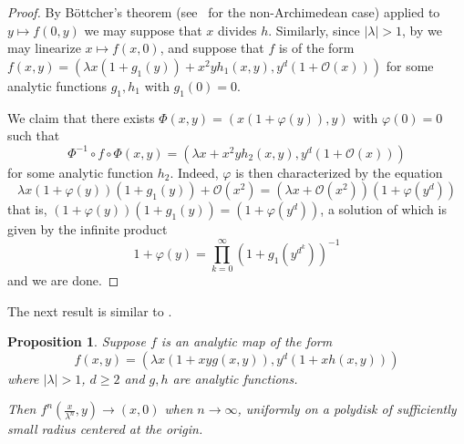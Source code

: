 \documentclass[11 pt, oneside, a4paper]{amsart}
\newcommand{\inv}{^{-1}}
\newtheorem{prop}[thm]{Proposition}
\theoremstyle{definition}
\theoremstyle{definition}
\begin{document}
\begin{proof}
By B\"ottcher's theorem (see~\cite[Chapter 4]{benedetto:dyn1NA} for the non-Archimedean case)
applied to $y \mapsto f(0,y)$ we may suppose that $x$ divides $h$.
Similarly, since $|\lambda|>1$, by  
we may linearize $x \mapsto f(x,0)$, and suppose that $f$ is of the form
$f(x,y) =  (\lambda x (1+ g_1(y))+ x^2y h_1(x,y) , y^d (1+\mathcal{O}(x)))$ for some analytic functions $g_1,h_1$ with $g_1(0)=0$. 
 
We claim that there exists $\Phi(x,y) = (x(1+ \varphi(y)), y)$
with $\varphi(0)=0$ such that 
$$\Phi\inv \circ f\circ \Phi(x,y) =  (\lambda x + x^2y h_2(x,y) , y^d(1+\mathcal{O}(x)))$$ 
for some analytic function $h_2$.
Indeed, $\varphi$ is then characterized by the equation 
\[ \lambda x(1+ \varphi(y))(1+g_1(y)) + \mathcal{O}(x^2)
=
(\lambda x + \mathcal{O}(x^2)) (1+ \varphi(y^d))
\]
that is, $(1+ \varphi(y))(1+g_1(y))= (1+ \varphi(y^d))$, a solution of which is given by the infinite product
\[
1+ \varphi(y) = \prod_{k=0}^\infty \left(1+g_1\left(y^{d^k}\right)\right)^{-1}
\] and we are done.
\end{proof}


The next result is similar to \cite[Lemma 4.2]{DMM-henon}.
 
\begin{prop}\label{prop:renormalization}
Suppose $f$ is an analytic map of the form 
\begin{equation}\label{eq:form_f_4}
f(x,y) =  (\lambda x (1+ xy g(x,y)) , y^d(1+ x h(x,y)))
\end{equation}
where $|\lambda| >1$, 
$d\ge 2$ and $g,h$ are analytic functions.

Then $f^n(\frac{x}{\lambda^n} , y) \to(x,0)$ when $n\to\infty$, 
uniformly on a polydisk of sufficiently small radius
centered at the origin.
\end{prop}
\end{document}
